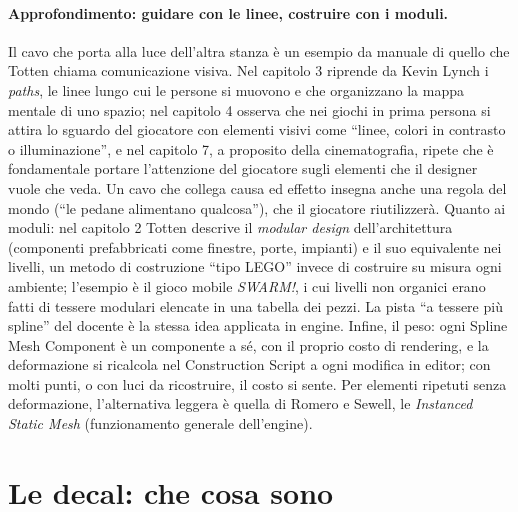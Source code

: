 \paragraph{Approfondimento: guidare con le linee, costruire con i moduli.} Il cavo che porta
alla luce dell'altra stanza è un esempio da manuale di quello che Totten chiama comunicazione
visiva. Nel capitolo 3 riprende da Kevin Lynch i \emph{paths}, le linee lungo cui le persone si
muovono e che organizzano la mappa mentale di uno spazio; nel capitolo 4 osserva che nei giochi
in prima persona si attira lo sguardo del giocatore con elementi visivi come ``linee, colori in
contrasto o illuminazione'', e nel capitolo 7, a proposito della cinematografia, ripete che è
fondamentale portare l'attenzione del giocatore sugli elementi che il designer vuole che veda.
Un cavo che collega causa ed effetto insegna anche una regola del mondo (``le pedane alimentano
qualcosa''), che il giocatore riutilizzerà. Quanto ai moduli: nel capitolo 2 Totten descrive il
\emph{modular design} dell'architettura (componenti prefabbricati come finestre, porte, impianti)
e il suo equivalente nei livelli, un metodo di costruzione ``tipo LEGO'' invece di costruire su
misura ogni ambiente; l'esempio è il gioco mobile \emph{SWARM!}, i cui livelli non organici erano
fatti di tessere modulari elencate in una tabella dei pezzi. La pista ``a tessere più spline'' del
docente è la stessa idea applicata in engine. Infine, il peso: ogni Spline Mesh Component è un
componente a sé, con il proprio costo di rendering, e la deformazione si ricalcola nel
Construction Script a ogni modifica in editor; con molti punti, o con luci da ricostruire, il
costo si sente. Per elementi ripetuti senza deformazione, l'alternativa leggera è quella di
Romero e Sewell, le \emph{Instanced Static Mesh} (funzionamento generale dell'engine).

\section{Le decal: che cosa sono}
\label{ue16:sec:decal}

